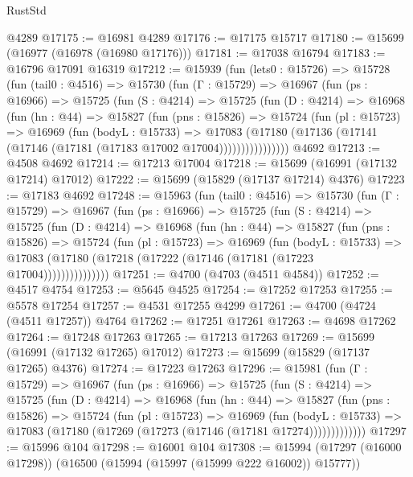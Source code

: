 \begin{lexlean}{RustStd}
\begin{coremodule}
    @4289
@17175 := @16981 @4289
@17176 := @17175 @15717
@17180 := @15699 (@16977 (@16978 (@16980 @17176)))
@17181 := @17038 @16794
@17183 := @16796 @17091 @16319
@17212 := @15939
    (fun (lets0 : @15726) =>
    @15728
      (fun (tail0 : @4516) =>
      @15730
        (fun (Γ : @15729) =>
        @16967
          (fun (ps : @16966) =>
          @15725
            (fun (S : @4214) =>
            @15725
              (fun (D : @4214) =>
              @16968
                (fun (hn : @44) =>
                @15827
                  (fun (pns : @15826) =>
                  @15724
                    (fun (pl : @15723) =>
                    @16969
                      (fun (bodyL : @15733) =>
                      @17083
                        (@17180
                          (@17136 (@17141 (@17146 (@17181 (@17183 @17002 @17004))))))))))))))))
    @4692
@17213 := @4508 @4692
@17214 := @17213 @17004
@17218 := @15699 (@16991 (@17132 @17214) @17012)
@17222 := @15699 (@15829 (@17137 @17214) @4376)
@17223 := @17183 @4692
@17248 := @15963
    (fun (tail0 : @4516) =>
    @15730
      (fun (Γ : @15729) =>
      @16967
        (fun (ps : @16966) =>
        @15725
          (fun (S : @4214) =>
          @15725
            (fun (D : @4214) =>
            @16968
              (fun (hn : @44) =>
              @15827
                (fun (pns : @15826) =>
                @15724
                  (fun (pl : @15723) =>
                  @16969
                    (fun (bodyL : @15733) =>
                    @17083 (@17180 (@17218 (@17222 (@17146 (@17181 (@17223 @17004)))))))))))))))
@17251 := @4700 (@4703 (@4511 @4584))
@17252 := @4517 @4754
@17253 := @5645 @4525
@17254 := @17252 @17253
@17255 := @5578 @17254
@17257 := @4531 @17255 @4299
@17261 := @4700 (@4724 (@4511 @17257)) @4764
@17262 := @17251 @17261
@17263 := @4698 @17262
@17264 := @17248 @17263
@17265 := @17213 @17263
@17269 := @15699 (@16991 (@17132 @17265) @17012)
@17273 := @15699 (@15829 (@17137 @17265) @4376)
@17274 := @17223 @17263
@17296 := @15981
    (fun (Γ : @15729) =>
    @16967
      (fun (ps : @16966) =>
      @15725
        (fun (S : @4214) =>
        @15725
          (fun (D : @4214) =>
          @16968
            (fun (hn : @44) =>
            @15827
              (fun (pns : @15826) =>
              @15724
                (fun (pl : @15723) =>
                @16969
                  (fun (bodyL : @15733) =>
                  @17083 (@17180 (@17269 (@17273 (@17146 (@17181 @17274)))))))))))))
@17297 := @15996 @104
@17298 := @16001 @104
@17308 := @15994 (@17297 (@16000 @17298)) (@16500 (@15994 (@15997 (@15999 @222 @16002)) @15777))

\end{coremodule}
\end{lexlean}
